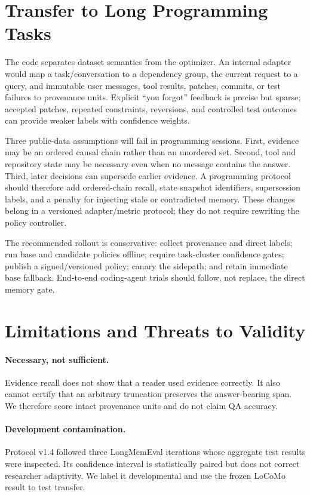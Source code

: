 \documentclass[10pt]{article}
\begin{document}
\section{Transfer to Long Programming Tasks}

The code separates dataset semantics from the optimizer. An internal adapter
would map a task/conversation to a dependency group, the current request to a
query, and immutable user messages, tool results, patches, commits, or test
failures to provenance units. Explicit ``you forgot'' feedback is precise but
sparse; accepted patches, repeated constraints, reversions, and controlled test
outcomes can provide weaker labels with confidence weights.

Three public-data assumptions will fail in programming sessions. First,
evidence may be an ordered causal chain rather than an unordered set. Second,
tool and repository state may be necessary even when no message contains the
answer. Third, later decisions can supersede earlier evidence. A programming
protocol should therefore add ordered-chain recall, state snapshot identifiers,
supersession labels, and a penalty for injecting stale or contradicted memory.
These changes belong in a versioned adapter/metric protocol; they do not require
rewriting the policy controller.

The recommended rollout is conservative: collect provenance and direct labels;
run base and candidate policies offline; require task-cluster confidence gates;
publish a signed/versioned policy; canary the sidepath; and retain immediate
base fallback. End-to-end coding-agent trials should follow, not replace, the
direct memory gate.

\section{Limitations and Threats to Validity}

\paragraph{Necessary, not sufficient.}
Evidence recall does not show that a reader used evidence correctly. It also
cannot certify that an arbitrary truncation preserves the answer-bearing span.
We therefore score intact provenance units and do not claim QA accuracy.

\paragraph{Development contamination.}
Protocol v1.4 followed three LongMemEval iterations whose aggregate test results
were inspected. Its confidence interval is statistically paired but does not
correct researcher adaptivity. We label it developmental and use the frozen
LoCoMo result to test transfer.
\end{document}
